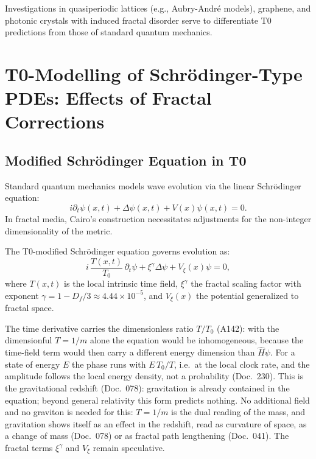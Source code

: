 	Investigations in quasiperiodic lattices (e.g., Aubry-André models), graphene, and photonic crystals with induced fractal disorder serve to differentiate T0 predictions from those of standard quantum mechanics.
	
	\section{T0-Modelling of Schrödinger-Type PDEs: Effects of Fractal Corrections}
	
	\subsection{Modified Schrödinger Equation in T0}
	
	Standard quantum mechanics models wave evolution via the linear Schrödinger equation:
	\begin{equation}
		i \partial_t \psi(x,t) + \Delta \psi(x,t) + V(x)\psi(x,t) = 0.
	\end{equation}
	In fractal media, Cairo's construction necessitates adjustments for the non-integer dimensionality of the metric.
	
	The T0-modified Schrödinger equation governs evolution as:
	\begin{equation}
		i\, \frac{T(x,t)}{T_0}\, \partial_t \psi + \xi^\gamma \Delta \psi + V_\xi(x)\psi = 0,
	\end{equation}
	where $T(x,t)$ is the local intrinsic time field, $\xi^\gamma$ the fractal scaling factor with exponent $\gamma = 1 - D_f/3 \approx 4.44 \times 10^{-5}$, and $V_\xi(x)$ the potential generalized to fractal space.

	The time derivative carries the dimensionless ratio $T/T_0$ (A142): with the dimensionful $T=1/m$ alone the equation would be inhomogeneous, because the time-field term would then carry a different energy dimension than $\hat H\psi$. For a state of energy $E$ the phase runs with $E\,T_0/T$, i.e.\ at the local clock rate, and the amplitude follows the local energy density, not a probability (Doc.~230). This is the gravitational redshift (Doc.~078): gravitation is already contained in the equation; beyond general relativity this form predicts nothing. No additional field and no graviton is needed for this: $T=1/m$ is the dual reading of the mass, and gravitation shows itself as an effect in the redshift, read as curvature of space, as a change of mass (Doc.~078) or as fractal path lengthening (Doc.~041). The fractal terms $\xi^\gamma$ and $V_\xi$ remain speculative.
	
